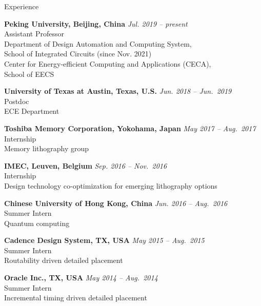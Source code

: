 
\begin{rSection}{Experience}

{\bf Peking University, Beijing, China}                           \hfill {\em Jul. 2019 -- present} \\
Assistant Professor \\
Department of Design Automation and Computing System, \\
School of Integrated Circuits (since Nov. 2021) \\
Center for Energy-efficient Computing and Applications (CECA), \\
School of EECS

{\bf University of Texas at Austin, Texas, U.S.}                           \hfill {\em Jun. 2018 -- Jun.~2019} \\
Postdoc \\
ECE Department

{\bf Toshiba Memory Corporation, Yokohama, Japan}                           \hfill {\em May 2017 -- Aug.~2017} \\
Internship \\
Memory lithography group

{\bf IMEC, Leuven, Belgium}                           \hfill {\em Sep. 2016 -- Nov.~2016} \\
Internship \\
Design technology co-optimization for emerging lithography options

{\bf Chinese University of Hong Kong, China}                           \hfill {\em Jun. 2016 -- Aug.~2016} \\
Summer Intern \\
Quantum computing

{\bf Cadence Design System, TX, USA}                           \hfill {\em May 2015 -- Aug.~2015} \\
Summer Intern \\
Routability driven detailed placement

{\bf Oracle Inc., TX, USA}                           \hfill {\em May 2014 -- Aug.~2014} \\
Summer Intern \\
Incremental timing driven detailed placement


\end{rSection}


